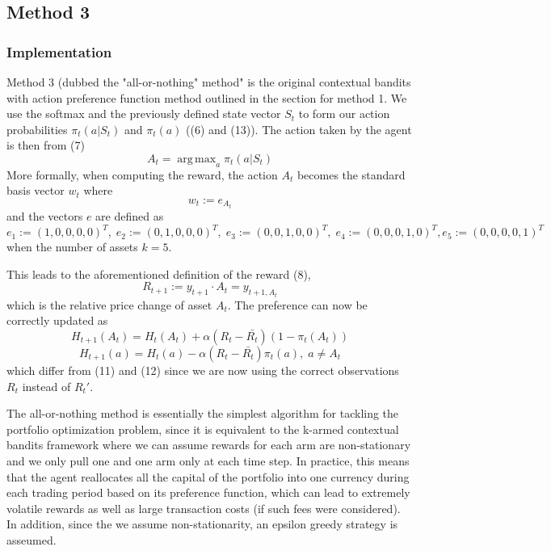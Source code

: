 \documentclass[a4paper,12pt]{article}
\DeclareMathOperator*{\argmax}{arg\,max}
\begin{document}
\subsection{Method 3}

\subsubsection{Implementation}
Method 3 (dubbed the "all-or-nothing" method" is the original contextual bandits with action preference function method outlined in the section for method 1. We use the softmax and the previously defined state vector $S_t$ to form our action probabilities $\pi_t (a|S_t)$ and $\pi_t (a)$ ((6) and (13)).
The action taken by the agent is then from (7)
$$A_t = \argmax_a \pi_t(a|S_t)$$
More formally, when computing the reward, the action $A_t$ becomes the standard basis vector $w_t$ where 
\begin{equation}
w_t := e_{A_t}
\end{equation}
and the vectors $e$ are defined as 
$$e_1 := (1,0,0,0,0)^T, \; e_2 := (0,1,0,0,0)^T, \; e_3 := (0,0,1,0,0)^T, \; e_4 := (0,0,0,1,0)^T, e_5 := (0,0,0,0,1)^T$$
when the number of assets $k=5$. \par
This leads to the aforementioned definition of the reward (8),
$$R_{t+1} := y_{t+1} \cdot A_t = y_{t+1,A_t}$$
which is the relative price change of asset $A_t$. The preference can now be correctly updated as 
\begin{equation}
H_{t+1}(A_t) = H_t(A_t) + \alpha (R_t - \bar{R_t})(1 - \pi_t(A_t))
\end{equation}
\begin{equation}
H_{t+1}(a) = H_t(a) - \alpha (R_t - \bar{R_t})\pi_t(a), \; a \neq A_t
\end{equation} 
which differ from (11) and (12) since we are now using the correct observations $R_t$ instead of $R_t'$. \par
The all-or-nothing method is essentially the simplest algorithm for tackling the portfolio optimization problem, since it is equivalent to the k-armed contextual bandits framework where we can assume rewards for each arm are non-stationary and we only pull one and one arm only at each time step. In practice, this means that the agent reallocates all the capital of the portfolio into one currency during each trading period based on its preference function, which can lead to extremely volatile rewards as well as large transaction costs (if such fees were considered). In addition, since the we assume non-stationarity, an epsilon greedy strategy is asseumed.
\end{document}

